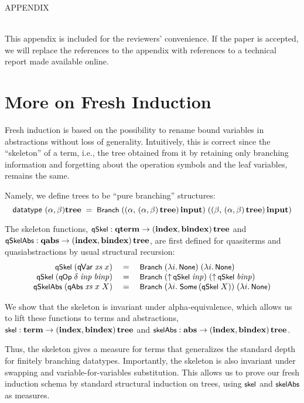 \appendix

\noindent
{\Large APPENDIX}

\ \\ 
This appendix is included for the reviewers' convenience. 
If the paper is accepted, we will replace the references to the appendix with 
references to a technical report made available online. 









\section{More on Fresh Induction} \label{app-moreInd}

Fresh induction is based on the possibility to 
rename bound variables in abstractions without loss of generality. 
Intuitively, this is correct since the ``skeleton'' of a term, i.e., the tree 
obtained from it by retaining only branching information and forgetting 
about the operation symbols and the leaf variables, remains the same. 

Namely, we define trees to be ``pure branching'' structures: 
%
$$
\textsf{datatype }(\alpha,\beta)\bf tree \;=\; 
\mbox{\rm\textsf{\small Branch}}\;((\alpha,\,(\alpha,\beta)\,\bf tree)\,\mbox{\bf input})\;((\beta,\,(\alpha,\beta)\,\bf tree)\,\mbox{\bf input})
$$ 

The skeleton functions,  
$\mbox{\rm\textsf{\small qSkel}} : \mbox{\bf qterm} \rightarrow (\mbox{\bf index},\mbox{\bf bindex})\,\bf tree$ and 
$\mbox{\rm\textsf{\small qSkelAbs}} : \mbox{\bf qabs} \rightarrow (\mbox{\bf index},\mbox{\bf bindex})\,\bf tree$, 
are first defined for quasiterms and quasiabstractions by usual structural recursion: 
%
$$
\begin{array}{rcl}
\mbox{\rm\textsf{\small qSkel}}\;(\mbox{\rm\textsf{q\hspace*{-0.2ex}Var}}\;\mbox{\textit{xs}}\;x) &\;=\;&
   \mbox{\rm\textsf{\small Branch}}\;(\lambda i.\,\mbox{\rm\textsf{\small None}})\;(\lambda i.\,\mbox{\rm\textsf{\small None}})
\\
\mbox{\rm\textsf{\small qSkel}}\;(\mbox{\rm\textsf{\small q\hspace*{-0.1ex}Op}}\;\delta\;\mbox{\textit{inp}}\;\mbox{\textit{binp}}) &\;=\;&
   \mbox{\rm\textsf{\small Branch}}\;(\mbox{$\uparrow$}\,\mbox{\rm\textsf{\small qSkel}}\;\mbox{\textit{inp}})\;(\mbox{$\uparrow$}\,\mbox{\rm\textsf{\small qSkel}}\;\mbox{\textit{binp}})
\\
\mbox{\rm\textsf{\small qSkelAbs}}\;(\mbox{\rm\textsf{\small q\hspace*{-0.1ex}Abs}}\;\mbox{\textit{xs}}\;x\;X) &\;=\;&
    \mbox{\rm\textsf{\small Branch}}\;(\lambda i.\;\mbox{\rm\textsf{\small Some}}\,(\mbox{\rm\textsf{\small qSkel}}\;X))\;(\lambda i.\,\mbox{\rm\textsf{\small None}})
\end{array}
$$

We show that the skeleton is invariant under alpha-equivalence, which allows 
us to lift these functions to terms and abstractions, 
$\mbox{\rm\textsf{\small skel}} : \mbox{\bf term} \rightarrow (\mbox{\bf index},\mbox{\bf bindex})\,\bf tree$ and 
$\mbox{\rm\textsf{\small skelAbs}} : \mbox{\bf abs} \rightarrow (\mbox{\bf index},\mbox{\bf bindex})\,\bf tree$. 

Thus, the skeleton gives a measure for terms that generalizes 
the standard depth for finitely branching datatypes. 
Importantly, the skeleton is also invariant under swapping and variable-for-variables substitution. 
This allows us to prove our fresh induction schema 
by standard structural induction on trees, using $\mbox{\rm\textsf{\small skel}}$ and $\mbox{\rm\textsf{\small skelAbs}}$ as measures.   



